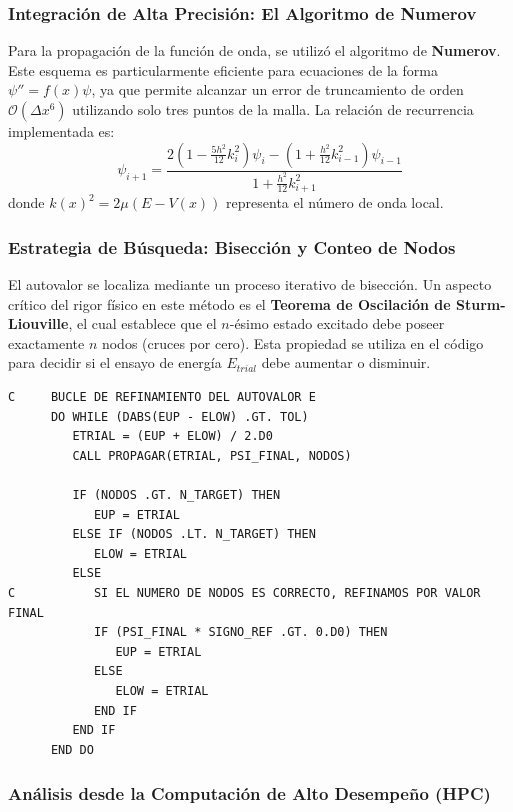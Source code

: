 \documentclass[11pt,fleqn]{article}
\begin{document}
\subsubsection{Integración de Alta Precisión: El Algoritmo de Numerov}

Para la propagación de la función de onda, se utilizó el algoritmo de \textbf{Numerov}. Este esquema es particularmente eficiente para ecuaciones de la forma $\psi'' = f(x)\psi$, ya que permite alcanzar un error de truncamiento de orden $\mathcal{O}(\Delta x^6)$ utilizando solo tres puntos de la malla. La relación de recurrencia implementada es:
\begin{equation}
    \psi_{i+1} = \frac{2(1 - \frac{5h^2}{12}k_i^2)\psi_i - (1 + \frac{h^2}{12}k_{i-1}^2)\psi_{i-1}}{1 + \frac{h^2}{12}k_{i+1}^2}
\end{equation}
donde $k(x)^2 = 2\mu(E - V(x))$ representa el número de onda local.

\subsubsection{Estrategia de Búsqueda: Bisección y Conteo de Nodos}

El autovalor se localiza mediante un proceso iterativo de bisección. Un aspecto crítico del rigor físico en este método es el \textbf{Teorema de Oscilación de Sturm-Liouville}, el cual establece que el $n$-ésimo estado excitado debe poseer exactamente $n$ nodos (cruces por cero). Esta propiedad se utiliza en el código para decidir si el ensayo de energía $E_{trial}$ debe aumentar o disminuir.

\begin{lstlisting}[caption=Lógica de bisección y control de nodos en morse\_shoot.f]
C     BUCLE DE REFINAMIENTO DEL AUTOVALOR E
      DO WHILE (DABS(EUP - ELOW) .GT. TOL)
         ETRIAL = (EUP + ELOW) / 2.D0
         CALL PROPAGAR(ETRIAL, PSI_FINAL, NODOS)
         
         IF (NODOS .GT. N_TARGET) THEN
            EUP = ETRIAL
         ELSE IF (NODOS .LT. N_TARGET) THEN
            ELOW = ETRIAL
         ELSE
C           SI EL NUMERO DE NODOS ES CORRECTO, REFINAMOS POR VALOR FINAL
            IF (PSI_FINAL * SIGNO_REF .GT. 0.D0) THEN
               EUP = ETRIAL
            ELSE
               ELOW = ETRIAL
            END IF
         END IF
      END DO
\end{lstlisting}

\subsubsection{Análisis desde la Computación de Alto Desempeño (HPC)}
\end{document}
